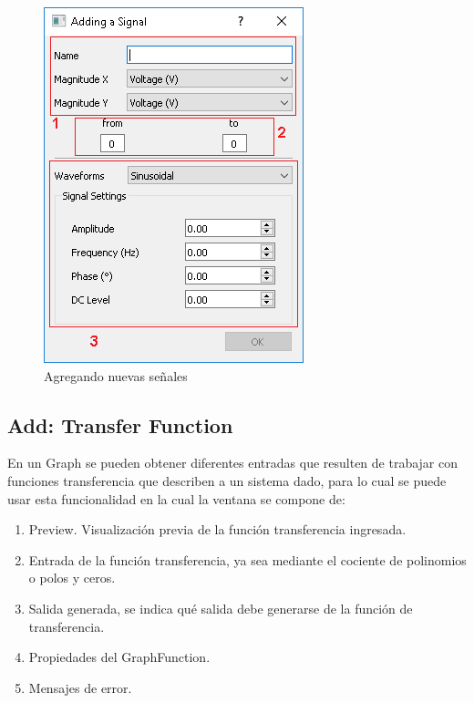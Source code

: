 \documentclass[a4paper,10pt]{article}
\begin{document}
\begin{figure}[H]
\begin{center}
	\includegraphics[scale=0.8]{resources/signal_dialog.png}
	\caption{Agregando nuevas señales}
\end{center}
\end{figure}

\subsection{Add: Transfer Function}
En un Graph se pueden obtener diferentes entradas que resulten de trabajar con funciones transferencia que describen a un sistema dado, para lo cual se puede usar esta funcionalidad en la cual la ventana se compone de:
\begin{enumerate}
	\item Preview. Visualizaci\'on previa de la funci\'on transferencia ingresada.
	\item Entrada de la funci\'on transferencia, ya sea mediante el cociente de polinomios o polos y ceros.
	\item Salida generada, se indica qu\'e salida debe generarse de la funci\'on de transferencia.
	\item Propiedades del GraphFunction.
	\item Mensajes de error.
\end{enumerate}
\end{document}
